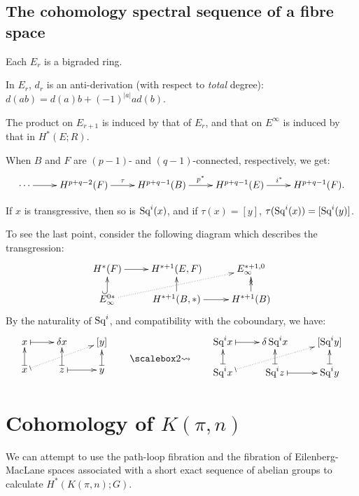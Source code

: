 \documentclass[11pt]{article}
\begin{document}
\subsection{The cohomology spectral sequence of a fibre space}
\begin{itemise}
\squishlist
\item Each $E_r$ is a bigraded ring.
\item In $E_r$, $d_r$ is an anti-derivation (with respect to \emph{total} degree): $d(ab)=d(a)b+(-1)^{|a|}ad(b)$.
\item The product on $E_{r+1}$ is induced by that of $E_r$, and that on $E^\infty$ is induced by that in $H^*(E;R)$.
\item When $B$ and $F$ are $(p-1)$- and $(q-1)$-connected, respectively, we get:
\[\xymatrix{
\cdots\ar[r]&H^{p+q-2}(F)\ar[r]^\tau&H^{p+q-1}(B)\ar[r]^{p^*}&H^{p+q-1}(E)\ar[r]^{i^*}&H^{p+q-1}(F).
}\]
\item If $x$ is transgressive, then so is $\textup{Sq}^i(x)$, and if $\tau(x)=[y]$, $\tau(\textup{Sq}^i(x))=[\textup{Sq}^i(y)]$.
\end{itemise}
To see the last point, consider the following diagram which describes the transgression:
\[\xymatrix@R=5mm{
H^*(F)\ar[r]&H^{*+1}(E,F)&E_\infty^{*+1,0}\\
E_\infty^{0*}\ar@{^{(}->}[u]\ar@{.>}[rur]&H^{*+1}(B,*)\ar[u]\ar[r]&H^{*+1}(B)\ar@{->>}[u]
}\]
By the naturality of $\textup{Sq}^i$, and compatibility with the coboundary, we have:
\[\xymatrix@R=5mm{
x\ar@{|->}[r]&\delta x&[y]\\
x\ar@{|.>}[rur]\ar@{|->}[u]&z\ar@{|->}[u]\ar@{|->}[r]&y\ar@{|->}[u]
}\raisebox{-.6cm}{\qquad\bigrightsquig\qquad }
\xymatrix@R=5mm{
\Squ^ix\ar@{|->}[r]&\delta\,\Squ^ix&[\Squ^iy]\\
\Squ^ix\ar@{|.>}[rur]\ar@{|->}[u]&\Squ^iz\ar@{|->}[u]\ar@{|->}[r]&\Squ^iy\ar@{|->}[u]
}\]

\section{Cohomology of \texorpdfstring{$K(\pi,n)$}{K(G,n)}}
We can attempt to use the path-loop fibration and the fibration of Eilenberg-MacLane spaces associated with a short exact sequence of abelian groups to calculate $H^*(K(\pi,n);G)$.
\end{document}
